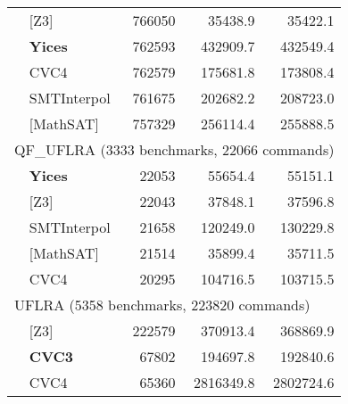 \begin{tabular}{|p{.1in}l|rrr|}
& [Z3] & 766050 & 35438.9 & 35422.1 \\
& \textbf{Yices} & 762593 & 432909.7 & 432549.4 \\
& CVC4 & 762579 & 175681.8 & 173808.4 \\
& SMTInterpol & 761675 & 202682.2 & 208723.0 \\
& [MathSAT] & 757329 & 256114.4 & 255888.5 \\
\hline
\multicolumn{5}{|l|}{QF\_UFLRA (3333 benchmarks, 22066 commands)} \\
& \textbf{Yices} & 22053 & 55654.4 & 55151.1 \\
& [Z3] & 22043 & 37848.1 & 37596.8 \\
& SMTInterpol & 21658 & 120249.0 & 130229.8 \\
& [MathSAT] & 21514 & 35899.4 & 35711.5 \\
& CVC4 & 20295 & 104716.5 & 103715.5 \\
\hline
\multicolumn{5}{|l|}{UFLRA (5358 benchmarks, 223820 commands)} \\
& [Z3] & 222579 & 370913.4 & 368869.9 \\
& \textbf{CVC3} & 67802 & 194697.8 & 192840.6 \\
& CVC4 & 65360 & 2816349.8 & 2802724.6 \\
\hline
\end{tabular}
